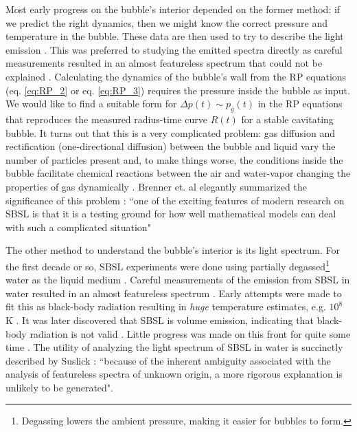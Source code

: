 \documentclass[rmp,aps,nofootinbib,superscriptaddress,floatfix]{revtex4-2}
\begin{document}
Most early progress on the bubble's interior depended on the former method: if we predict the right dynamics, then we might know the correct pressure and temperature in the bubble. These data are then used to try to describe the light emission \cite{}. This was preferred to studying the emitted spectra directly as careful measurements resulted in an almost featureless spectrum that could not be explained \cite{}. Calculating the dynamics of the bubble's wall from the RP equations (eq. \ref{eq:RP_2} or eq. \ref{eq:RP_3}) requires the pressure inside the bubble as input. We would like to find a suitable form for $\Delta p(t) \sim p_g(t)$ in the RP equations that reproduces the measured radius-time curve $R(t)$ for a stable cavitating bubble. It turns out that this is a very complicated problem: gas diffusion and rectification (one-directional diffusion) between the bubble and liquid vary the number of particles present and, to make things worse, the conditions inside the bubble facilitate chemical reactions between the air and water-vapor changing the properties of gas dynamically \cite{brenner2002single}. Brenner et. al elegantly summarized the significance of this problem \cite{brenner2002single}: ``one of the exciting features of modern research on SBSL is that it is a testing ground for how well mathematical models can deal with such a complicated situation"

The other method to understand the bubble's interior is its light spectrum. For the first decade or so, SBSL experiments were done using partially degassed\footnote{Degassing lowers the ambient pressure, making it easier for bubbles to form.} water as the liquid medium \cite{suslick2008inside,brenner2002single,gaitan1992sonoluminescence}. Careful measurements of the emission from SBSL in water resulted in an almost featureless spectrum \cite{}. Early attempts were made to fit this as black-body radiation resulting in \emph{huge} temperature estimates, e.g. $10^8$ K \cite{}. It was later discovered that SBSL is volume emission, indicating that black-body radiation is not valid \cite{}. Little progress was made on this front for quite some time \cite{brenner2002single}. The utility of analyzing the light spectrum of SBSL in water is succinctly described by Suslick \cite{suslick2008inside}: ``because of the inherent ambiguity associated with the analysis of featureless spectra of unknown origin, a more rigorous explanation is unlikely to be generated". 
\end{document}
